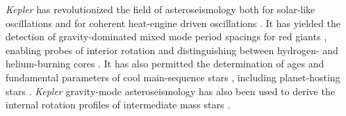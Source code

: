 \documentclass[a4paper,fleqn,usenatbib]{mnras}
\newcommand{\kepler}{\textit{Kepler}\xspace}
\begin{document}
\kepler has revolutionized the field of asteroseismology both for solar-like oscillations \citep{2010PASP..122..131G,2010ApJ...713L.169C} and for coherent heat-engine driven oscillations \citep{2018arXiv180907779A}. It has yielded the detection of gravity-dominated mixed mode period spacings for red giants \citep{rggmodes,2014A&A...572L...5M}, enabling probes of interior rotation \citep{rggmoderotation,2012A&A...548A..10M,2012ApJ...756...19D} and distinguishing between hydrogen- and helium-burning cores \citep{rggmodehelium,2012A&A...540A.143M}. It has also permitted the determination of ages and fundamental parameters of cool main-sequence stars \citep{silvaages}, including planet-hosting stars \citep{huberplanetages,silvaaguirre2015,2016MNRAS.456.2183D,2018MNRAS.479.4786V}. \kepler gravity-mode asteroseismology has also been used to derive the internal rotation profiles of intermediate mass stars \citep{triana15,vanreeth18}. %
\end{document}
